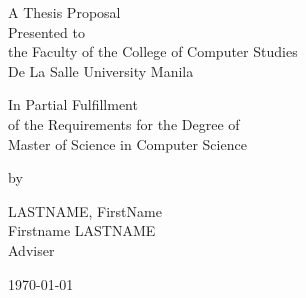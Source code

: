 %
%
%                 

\begin{titlepage}
\centering



\vspace{1.75cm}
A Thesis Proposal\\
Presented to\\
the Faculty of the College of Computer Studies\\
De La Salle University Manila

\vspace{1.75cm}
In Partial Fulfillment\\
of the Requirements for the Degree of\\
Master of Science in Computer Science

\vspace{1.75cm}
by\\
\vspace{1cm}

LASTNAME, FirstName  \\


\vspace{1.75cm}
Firstname LASTNAME \\
Adviser

\vspace{1.75cm}
\today
\end{titlepage}
